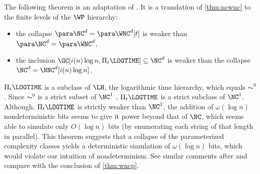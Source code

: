 The following theorem is an adaptation of \autocite[Theorem~4.3]{cc97npo}.
It is a translation of \autoref{thm:ncwnc} to the finite levels of the $\WP$ hierarchy:
\begin{itemize}
\item the collapse $\para \NC^d = \para \WNC^d[t]$ is weaker than $\para \NC^d = \para \WNC^d$,
\item the inclusion $\GC[i(n) \log n, \Pi_t \LOGTIME] \subseteq \NC^d$ is weaker than the collapse $\NC^d = \NNC^d[i(n) \log n]$.
\end{itemize}
$\Pi_t \LOGTIME$ is a subclass of $\LH$, the logarithmic time hierarchy, which equals $\AC^0$ \autocite[Corollary~5.32]{immerman99}.
Since $\AC^0$ is a strict subset of $\NC^1$ \autocite{fss84}, $\Pi_t \LOGTIME$ is a strict subclass of $\NC^1$.
Although, $\Pi_t \LOGTIME$ is strictly weaker than $\NC^1$, the addition of $\omega(\log n)$ nondeterministic bits seems to give it power beyond that of $\NC$, which seems able to simulate only $O(\log n)$ bits (by enumerating each string of that length in parallel).
This theorem suggests that a collapse of the parameterized complexity classes yields a deterministic simulation of $\omega(\log n)$ bits, which would violate our intuition of nondeterminism.
See similar comments after \autocite[Theorem~4.3]{cc97npo} and compare with the conclusion of \autoref{thm:wncp}.

